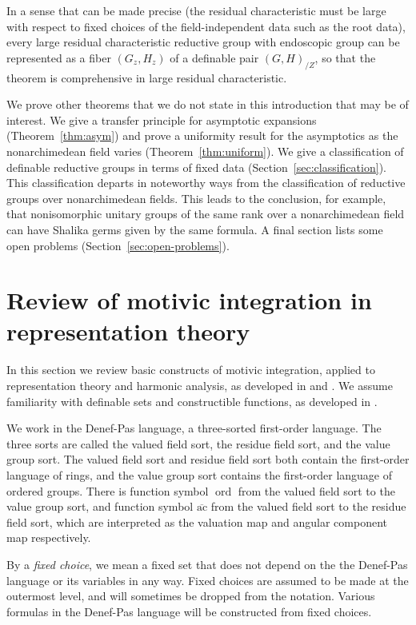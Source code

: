 \documentclass[12pt]{amsart}
\newcommand{\op}[1]{\operatorname{#1}}
\newcommand\ac{\overline{\mathrm{ac}}}
\theoremstyle{plain}
\theoremstyle{definition}
\begin{document}
In a sense that can be made precise (the residual characteristic must
be large with respect to fixed choices of the field-independent data
such as the root data), every large residual characteristic reductive
group with endoscopic group can be represented as a fiber $(G_z,H_z)$
of a definable pair $(G,H)_{/Z}$, so that the theorem is comprehensive in
large residual characteristic.

We prove other theorems that we do not state in this introduction that
may be of interest.  We give a transfer principle for asymptotic
expansions (Theorem~\ref{thm:asym}) and prove a uniformity result for
the asymptotics as the nonarchimedean field varies
(Theorem~\ref{thm:uniform}).  We give a classification of definable
reductive groups in terms of fixed data
(Section~\ref{sec:classification}).  This classification departs in
noteworthy ways from the classification of reductive groups over
nonarchimedean fields.  This leads to the conclusion, for example,
that nonisomorphic unitary groups of the same rank over a
nonarchimedean field can have Shalika germs given by the same formula.
A final section lists some open problems
(Section~\ref{sec:open-problems}).


\section{Review of motivic integration in representation theory}

In this section we review basic constructs of motivic integration,
applied to representation theory and harmonic analysis, as developed
in \cite{CHL} and \cite{CGH}.  We assume familiarity with definable
sets and constructible functions, as developed in \cite{CL}.

We work in the Denef-Pas language, a three-sorted first-order
language.  The three sorts are called the valued field sort, the
residue field sort, and the value group sort.  The valued field sort
and residue field sort both contain the first-order language of rings,
and the value group sort contains the first-order language of ordered
groups.  There is function symbol $\op{ord}$ from the valued field
sort to the value group sort, and function symbol $\ac$ from the
valued field sort to the residue field sort, which are interpreted as
the valuation map and angular component map respectively.

By a {\it fixed choice}, we mean a fixed set that does not depend
on the the Denef-Pas language or its variables in any way.  Fixed
choices are assumed to be made at the outermost level, and
will sometimes be dropped from the notation.  Various formulas
in the Denef-Pas language will be constructed from fixed choices.
\end{document}
